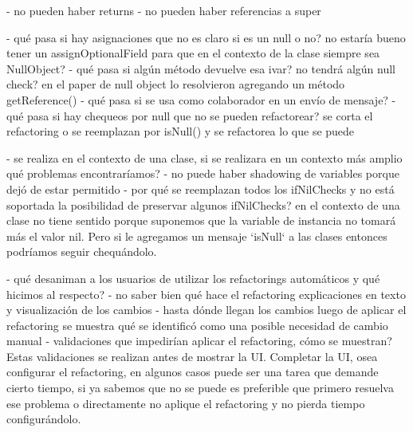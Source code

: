 

- no pueden haber returns
- no pueden haber referencias a super


- qué pasa si hay asignaciones que no es claro si es un null o no?
no estaría bueno tener un assignOptionalField para que en el contexto de la clase siempre sea NullObject?
- qué pasa si algún método devuelve esa ivar? no tendrá algún null check?
en el paper de null object lo resolvieron agregando un método getReference()
- qué pasa si se usa como colaborador en un envío de mensaje?
- qué pasa si hay chequeos por null que no se pueden refactorear?
se corta el refactoring o se reemplazan por isNull() y se refactorea lo que se puede

- se realiza en el contexto de una clase, si se realizara en un contexto más amplio qué problemas encontraríamos?
- no puede haber shadowing de variables porque dejó de estar permitido
- por qué se reemplazan todos los ifNilChecks y no está soportada la posibilidad de preservar algunos ifNilChecks? 
en el contexto de una clase no tiene sentido porque suponemos que la variable de instancia no
tomará más el valor nil. Pero si le agregamos un mensaje `isNull` a las clases entonces
podríamos seguir chequándolo. 




- qué desaniman a los usuarios de utilizar los refactorings automáticos y qué hicimos al respecto?
    - no saber bien qué hace el refactoring
    explicaciones en texto y visualización de los cambios
    - hasta dónde llegan los cambios
    luego de aplicar el refactoring se muestra qué se identificó como una posible necesidad de cambio manual
- validaciones que impedirían aplicar el refactoring, cómo se muestran? Estas validaciones se
realizan antes de mostrar la UI. Completar la UI, osea configurar el refactoring, en algunos
casos puede ser una tarea que demande cierto tiempo, si ya sabemos que no se puede es preferible
que primero resuelva ese problema o directamente no aplique el refactoring y no pierda tiempo
configurándolo.



